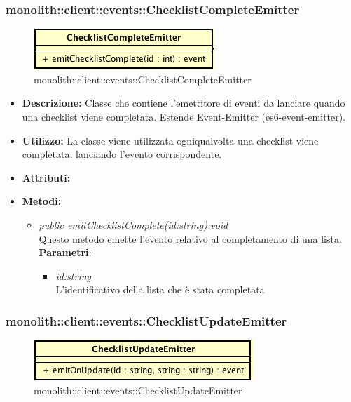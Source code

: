 \subsubsection{monolith::client::events::ChecklistCompleteEmitter}

\label{monolith::client::events::ChecklistCompleteEmitter}
\begin{figure}[H]
	\centering
	\includegraphics[scale=0.5]{Sezioni/SottosezioniST/img/ChecklistCompleteEmitter.png}
	\caption{monolith::client::events::ChecklistCompleteEmitter}
\end{figure}

\begin{itemize}
\item \textbf{Descrizione:} Classe che contiene l'emettitore di eventi da lanciare quando una checklist viene completata. Estende Event-Emitter (es6-event-emitter).
\item \textbf{Utilizzo:} La classe viene utilizzata ogniqualvolta una checklist viene completata, lanciando l'evento corrispondente.
\item \textbf{Attributi:}
\item \textbf{Metodi:}
\begin{itemize}
\item \textit{public emitChecklistComplete(id:string):void}\\
Questo metodo emette l'evento relativo al completamento di una lista.
			\\ \textbf{Parametri}: \begin{itemize}
			\item \textit{id:string}\\
			L'identificativo della lista che è stata completata
			\end{itemize} 
\end{itemize}
\end{itemize}

\subsubsection{monolith::client::events::ChecklistUpdateEmitter}

\label{monolith::client::events::ChecklistUpdateEmitter}
\begin{figure}[H]
	\centering
	\includegraphics[scale=0.5]{Sezioni/SottosezioniST/img/ChecklistUpdateEmitter.png}
	\caption{monolith::client::events::ChecklistUpdateEmitter}
\end{figure}

